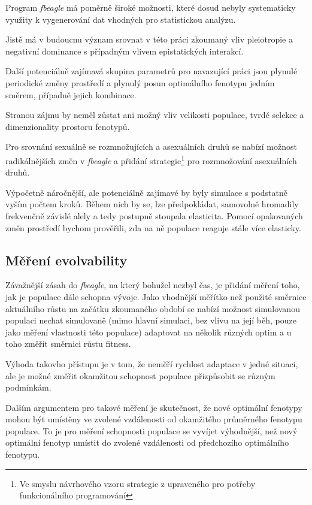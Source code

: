 Program \textit{fbeagle} má poměrně široké možnosti, které dosud nebyly systematicky využity k
vygenerování dat vhodných pro statistickou analýzu.

Jistě má v budoucnu význam srovnat v této práci zkoumaný vliv pleiotropie a negativní dominance s případným vlivem
epistatických interakcí.

Další potenciálně zajímavá skupina parametrů pro navazující práci jsou plynulé periodické změny prostředí
a plynulý posun optimálního fenotypu jedním směrem, případně jejich kombinace.

Stranou zájmu by neměl zůstat ani možný vliv velikosti populace, tvrdé selekce a dimenzionality prostoru fenotypů.

Pro srovnání sexuálně se rozmnožujících a asexuálních druhů se nabízí možnost radikálnějších změn v \textit{fbeagle}
a přidání strategie\footnote{Ve smyslu návrhového vzoru strategie z \citet{GammaHelmEtAl95} upraveného pro potřeby
funkcionálního programování} pro rozmnožování asexuálních druhů.

Výpočetně náročnější, ale potenciálně zajímavé by byly simulace s podstatně vyším počtem kroků. Během nich by se, lze
předpokládat, samovolně hromadily frekvenčně závislé alely a tedy postupně stoupala elasticita.
Pomocí opakovaných změn prostředí bychom prověřili, zda na ně populace reaguje stále více elasticky.

\subsection{Měření evolvability}

Závažnější zásah do \textit{fbeagle}, na který bohužel nezbyl čas, je přidání měření toho, jak je populace
dále schopna vývoje. Jako vhodnější měřítko než použité směrnice aktuálního růstu na začátku zkoumaného období
se nabízí možnost simulovanou populaci nechat simulovaně (mimo hlavní simulaci, bez vlivu na její běh,
pouze jako měření vlastnosti této populace) adaptovat na několik různých optim a u toho změřit směrnici
růstu fitness.

Výhoda takovho přístupu je v tom, že neměří rychlost adaptace v jedné situaci, ale je možné změřit okamžitou schopnost
populace přizpůsobit se různým podmínkám.

Dalším argumentem pro takové měření je skutečnost, že nové optimální fenotypy mohou být umístěny ve zvolené vzdálenosti
od okamžitého průměrného fenotypu populace. To je pro měření schopnosti populace se vyvíjet výhodnější, než nový
optimální fenotyp umístit do zvolené vzdálenosti od předchozího optimálního fenotypu.
